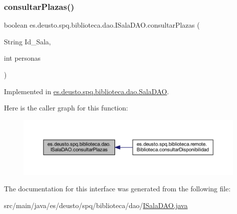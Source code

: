 \subsubsection{\texorpdfstring{consultar\+Plazas()}{consultarPlazas()}}
{\footnotesize\ttfamily boolean es.\+deusto.\+spq.\+biblioteca.\+dao.\+I\+Sala\+D\+A\+O.\+consultar\+Plazas (\begin{DoxyParamCaption}\item[{String}]{Id\+\_\+\+Sala,  }\item[{int}]{personas }\end{DoxyParamCaption})}



Implemented in \mbox{\hyperlink{classes_1_1deusto_1_1spq_1_1biblioteca_1_1dao_1_1_sala_d_a_o_a3095e0681af1d32bd5706ca6941e0784}{es.\+deusto.\+spq.\+biblioteca.\+dao.\+Sala\+D\+AO}}.

Here is the caller graph for this function\+:
\nopagebreak
\begin{figure}[H]
\begin{center}
\leavevmode
\includegraphics[width=350pt]{interfacees_1_1deusto_1_1spq_1_1biblioteca_1_1dao_1_1_i_sala_d_a_o_af12c5fe6a1abe11bc65e1118d991f926_icgraph}
\end{center}
\end{figure}


The documentation for this interface was generated from the following file\+:\begin{DoxyCompactItemize}
\item 
src/main/java/es/deusto/spq/biblioteca/dao/\mbox{\hyperlink{_i_sala_d_a_o_8java}{I\+Sala\+D\+A\+O.\+java}}\end{DoxyCompactItemize}
